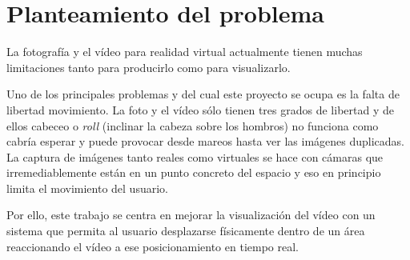 
\pagestyle{empty}
\chapter {Planteamiento del problema}

La fotografía y el vídeo para realidad virtual actualmente tienen muchas limitaciones tanto para producirlo como para visualizarlo.

Uno de los principales problemas y del cual este proyecto se ocupa es la falta de libertad movimiento. La foto y el vídeo sólo tienen tres grados de libertad y de ellos cabeceo o \textit{roll} (inclinar la cabeza sobre los hombros) no funciona como cabría esperar y puede provocar desde mareos hasta ver las imágenes duplicadas. La captura de imágenes tanto reales como virtuales se hace con cámaras que irremediablemente están en un punto concreto del espacio y eso en principio limita el movimiento del usuario.

Por ello, este trabajo se centra en mejorar la visualización del vídeo con un sistema que permita al usuario desplazarse físicamente dentro de un área reaccionando el vídeo a ese posicionamiento en tiempo real.